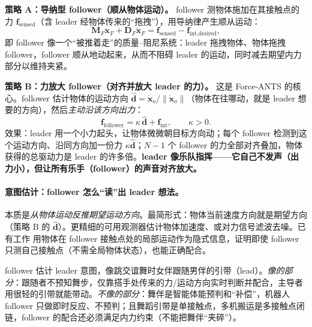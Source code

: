 \textbf{策略 A：导纳型 follower（顺从物体运动）。} follower 测物体施加在其接触点的力 $\mathbf{f}_{\text{sensed}}$（含 leader 经物体传来的“拖拽”），用导纳律产生顺从运动：
\begin{equation}
  \mathbf{M}_F\ddot{\mathbf{x}}_F+\mathbf{D}_F\dot{\mathbf{x}}_F=\mathbf{f}_{\text{sensed}}-\mathbf{f}_{\text{int,desired}},
  \label{eq:cm-follower-adm}
\end{equation}
即 follower 像一个“被推着走”的质量–阻尼系统：leader 拖拽物体、物体拖拽 follower，follower 顺从地动起来，从而不阻碍 leader 的运动，同时减去期望内力部分以维持夹紧。

\textbf{策略 B：力放大 follower（对齐并放大 leader 的力）。} 这是 Force-ANTS 的核心。follower 估计物体的运动方向 $\hat{\mathbf{d}}=\dot{\mathbf{x}}_o/\|\dot{\mathbf{x}}_o\|$（物体在往哪动，就是 leader 想要的方向），然后\emph{主动沿该方向出力}：
\begin{equation}
  \mathbf{f}_{\text{follower}}=\kappa\,\hat{\mathbf{d}}+\mathbf{f}_{\text{int}},\qquad \kappa>0.
  \label{eq:cm-follower-amp}
\end{equation}
效果：leader 用一个小力起头，让物体微微朝目标方向动；每个 follower 检测到这个运动方向、沿同方向加一份力 $\kappa\hat{\mathbf{d}}$；$N-1$ 个 follower 的力全部对齐叠加，物体获得的总驱动力是 leader 的许多倍。\textbf{leader 像乐队指挥——它自己不发声（出力小），但让所有乐手（follower）的声音对齐放大。}

\paragraph{意图估计：follower 怎么“读”出 leader 想法。}
本质是\emph{从物体运动反推期望运动方向}。最简形式：物体当前速度方向就是期望方向（策略 B 的 $\hat{\mathbf{d}}$）。更精细的可用观测器估计物体加速度、或对力信号滤波去噪。已有工作\cite{wang2018collaborative} 用物体在 follower 接触点处的局部运动作为隐式信息，证明即使 follower 只测自己接触点（不需全局物体状态），也能正确配合。

\begin{note}
follower 估计 leader 意图，像跳交谊舞时女伴跟随男伴的引带（lead）。\emph{像的部分}：跟随者不预知舞步，仅靠搭手处传来的力/运动方向实时判断并配合，主导者用很轻的引带就能带动。\emph{不像的部分}：舞伴是智能体能预判和“补偿”，机器人 follower 只做即时反应、不预判；且舞蹈引带是单接触点，多机搬运是多接触点闭链，follower 的配合还必须满足内力约束（不能把舞伴“夹碎”）。
\end{note}

